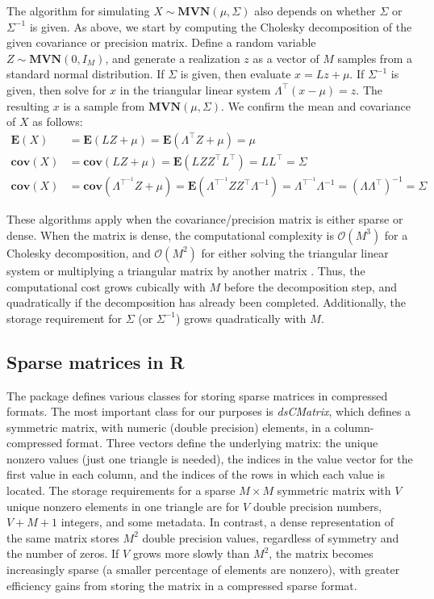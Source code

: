 \documentclass[codesnippet,nojss]{jss}\usepackage[]{graphicx}\usepackage[]{color}
\newcommand{\class}[1]{\textsl{#1}}
\newcommand{\EV}[1]{\mathbf{E}\!\left(#1\right)}
\newcommand{\Cov}[1]{\mathbf{cov}\!\left(#1\right)}
\newcommand{\MVN}[1]{\mathbf{MVN}\!\left(#1\right)}
\newcommand{\bigO}[1]{\mathcal{O}\!\left(#1\right)}
\begin{document}
The algorithm for simulating  $X\sim\MVN{\mu,\Sigma}$ also
depends on whether
$\Sigma$ or $\Sigma^{-1}$ is given.  As above, we start by computing
the Cholesky decomposition of the given covariance or precision
matrix. Define a random variable $Z\sim\MVN{0,I_M}$, and generate a realization
$z$ as a vector of $M$ samples from a standard normal distribution.  If $\Sigma$ is given,
then evaluate $x=Lz+\mu$.  If $\Sigma^{-1}$ is given, then solve for $x$ in the
triangular linear system $\Lambda^\top\left(x-\mu\right)=z$. The
resulting $x$ is a sample from $\MVN{\mu,\Sigma}$.  We confirm the
mean and covariance of $X$ as follows:
 \begin{align}
 \EV{X}&=\EV{LZ+\mu}=\EV{\Lambda^\top Z+\mu}=\mu\\
   \Cov{X}&= \Cov{LZ+\mu}=\EV{LZZ^\top L^\top}=LL^\top=\Sigma\\
     \Cov{X}&=\Cov{\Lambda^{\top^{-1}}Z+\mu}=\EV{\Lambda^{\top^{-1}}ZZ^\top\Lambda^{-1}}
     =\Lambda^{\top^{-1}}\Lambda^{-1}=(\Lambda\Lambda^\top)^{-1}=\Sigma
 \end{align}

These algorithms apply when the covariance/precision matrix is either
sparse or dense.  When the matrix is dense, the computational
complexity is $\bigO{M^3}$  for a Cholesky decomposition, and
$\bigO{M^2}$ for either solving the triangular linear
system or multiplying a triangular matrix by another matrix
\citep{GolubVanLoan1996}.  Thus, the computational cost grows
cubically with $M$ before the decomposition step, and quadratically if
the decomposition has already been completed.  Additionally, the storage
requirement for $\Sigma$ (or $\Sigma^{-1}$) grows quadratically with $M$.



\subsection{Sparse matrices in R}\label{sec:sparse}

The  package \citep{R_Matrix} defines
various classes for storing sparse matrices in compressed formats. The
most important class for our purposes is
\class{dsCMatrix}, which defines a symmetric matrix, with numeric
(double precision) elements, in a column-compressed format.  Three
vectors define the underlying matrix:
the unique nonzero values (just one triangle is needed), the indices
in the value vector for the first value in each column, and the indices of the rows in
which each value is located. The storage requirements
for a sparse $M\times M$ symmetric matrix with $V$ unique nonzero
elements in one triangle are for $V$ double precision numbers, $V+M+1$ integers, and
some metadata.  In contrast, a dense representation of the same matrix
stores $M^2$ double precision values, regardless of symmetry and the number of
zeros. If $V$ grows more slowly than $M^2$, the matrix becomes
increasingly sparse (a smaller percentage of elements are nonzero),
with greater efficiency gains from storing the matrix in a
compressed sparse format.
\end{document}
